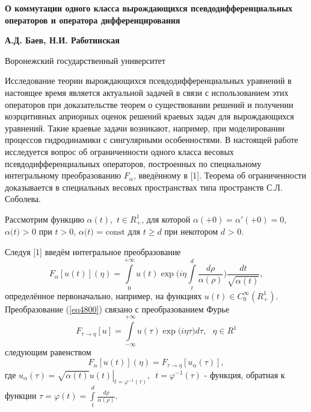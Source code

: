 \begin{center}
\textbf{О коммутации одного класса вырождающихся псевдодифференциальных
операторов и оператора дифференцирования}
\end{center}

\begin{center}
\textbf{А.Д. Баев, Н.И. Работинская}
\end{center}


\begin{center}
Воронежский государственный университет
\end{center}

{\sloppy

Исследование теории вырождающихся псевдодифференциальных уравнений в
настоящее время является актуальной задачей в связи с использованием этих
операторов при доказательстве теорем о существовании решений и получении
коэрцитивных априорных оценок решений краевых задач для вырождающихся
уравнений. Такие краевые задачи возникают, например, при моделировании
процессов гидродинамики с сингулярными особенностями. В настоящей работе
исследуется вопрос об ограниченности одного класса весовых
псевдодифференциальных операторов, построенных по специальному интегральному
преобразованию $F_\alpha $, введённому в [1]. Теорема об ограниченности
доказывается в специальных весовых пространствах типа пространств С.Л.
Соболева.

Рассмотрим функцию $\alpha (t),\,\,t \in R_ + ^1 $, для которой $\alpha ( +
0) = {\alpha }'( + 0) = 0$, $\alpha \mbox{(}t\mbox{) > 0}$ при $t > 0$,
$\alpha \mbox{(}t\mbox{) = const}$ для $t \ge d$ при некотором $d\mbox{ >
0}$.

Следуя [1] введём интегральное преобразование
\begin{equation}
\label{eq4800}
F_\alpha [u(t)](\eta ) = \int\limits_0^{ + \infty } {u(t)\exp (i\eta }
\int\limits_t^d {\frac{d\rho }{\alpha (\rho )}} )\frac{dt}{\sqrt {\alpha
(t)} },
\end{equation}
определённое первоначально, например, на функциях $u(t) \in C_0^\infty (R_ +
^1 )$. Преобразование (\ref{eq4800}) связано с преобразованием Фурье
\[
F_{\tau \to \eta } [u] = \int\limits_{ - \infty }^{ + \infty } {u(\tau )\exp
(i\eta } \tau )d\tau ,\,\,\,\,\eta \in R^1
\]
следующим равенством
\[
F_\alpha [u(t)](\eta ) = F_{\tau \to \eta } [u_\alpha (\tau )],
\]
где $u_\alpha (\tau ) = \left. {\sqrt {\alpha (t)} u(t)} \right|_{t =
\varphi ^{ - 1}(\tau )} ,\,\,\,t = \varphi ^{ - 1}(\tau )$ - функция,
обратная к функции $\tau = \varphi (t) = \int\limits_t^d {\frac{d\rho
}{\alpha (\rho )}} .$

}
